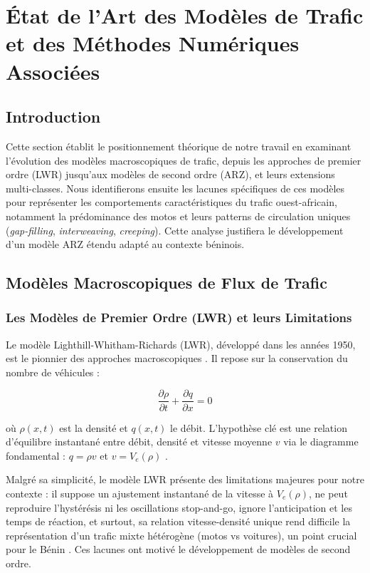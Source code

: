 \section{État de l'Art des Modèles de Trafic et des Méthodes Numériques Associées}
\label{sec:etat_art_modeles}

\subsection{Introduction}

Cette section établit le positionnement théorique de notre travail en examinant l'évolution des modèles macroscopiques de trafic, depuis les approches de premier ordre (LWR) jusqu'aux modèles de second ordre (ARZ), et leurs extensions multi-classes. Nous identifierons ensuite les lacunes spécifiques de ces modèles pour représenter les comportements caractéristiques du trafic ouest-africain, notamment la prédominance des motos et leurs patterns de circulation uniques (\textit{gap-filling}, \textit{interweaving}, \textit{creeping}). Cette analyse justifiera le développement d'un modèle ARZ étendu adapté au contexte béninois.

\subsection{Modèles Macroscopiques de Flux de Trafic}
\subsubsection{Les Modèles de Premier Ordre (LWR) et leurs Limitations}
Le modèle Lighthill-Whitham-Richards (LWR), développé dans les années 1950, est le pionnier des approches macroscopiques \cite{LighthillWhitham1955, Richards1956}. Il repose sur la conservation du nombre de véhicules :

\begin{equation}
    \frac{\partial \rho}{\partial t} + \frac{\partial q}{\partial x} = 0
\end{equation}

où $\rho(x, t)$ est la densité et $q(x, t)$ le débit. L'hypothèse clé est une relation d'équilibre instantané entre débit, densité et vitesse moyenne $v$ via le diagramme fondamental : $q = \rho v$ et $v = V_e(\rho)$ \cite{Lebacque1993}.

Malgré sa simplicité, le modèle LWR présente des limitations majeures pour notre contexte : il suppose un ajustement instantané de la vitesse à $V_e(\rho)$, ne peut reproduire l'hystérésis ni les oscillations stop-and-go, ignore l'anticipation et les temps de réaction, et surtout, sa relation vitesse-densité unique rend difficile la représentation d'un trafic mixte hétérogène (motos vs voitures), un point crucial pour le Bénin \cite{FanHertySeibold2014, AwKlarMaterneRascle2000, WongWong2002}. Ces lacunes ont motivé le développement de modèles de second ordre.

